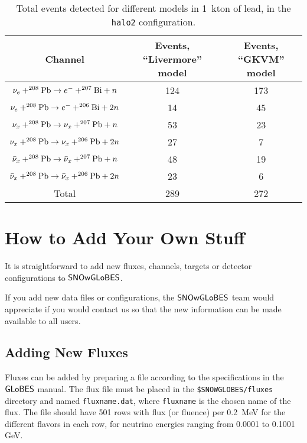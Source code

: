 \documentclass[12pt]{article}
\newcommand{\globes}{\sf{GLoBES}}
\newcommand{\snowglobes}{\sf{SNOwGLoBES}}
\begin{document}
\begin{table}[h]
\centering
\begin{tabular}{|c|c|c|} \hline
Channel & Events, ``Livermore'' model & Events, ``GKVM'' model  \\
\hline

$\nu_e + ^{208}{\rm Pb} \rightarrow e^- + ^{207}{\rm Bi} + n$ & 124  &  173\\
$\nu_e + ^{208}{\rm Pb} \rightarrow e^- + ^{206}{\rm Bi} + 2n$ & 14   & 45 \\
$\nu_x + ^{208}{\rm Pb} \rightarrow \nu_x + ^{207}{\rm Pb} + n$ & 53  & 23 \\
$\nu_x + ^{208}{\rm Pb} \rightarrow \nu_x + ^{206}{\rm Pb} + 2n$ & 27  & 7 \\
$\bar{\nu}_x + ^{208}{\rm Pb} \rightarrow \bar{\nu}_x + ^{207}{\rm Pb} + n$ & 48  & 19 \\
$\bar{\nu}_x + ^{208}{\rm Pb} \rightarrow \bar{\nu}_x + ^{206}{\rm Pb} + 2n$ & 23 & 6 \\



\hline

Total & 289  & 272  \\ \hline
\end{tabular}
\caption{Total events detected for different models in 1~kton of lead, in the \texttt{halo2} configuration. }
\label{tab:leadtable}
\end{table}



\section{How to Add Your Own Stuff}\label{addingnew}

It is straightforward to add new fluxes, channels, targets or detector configurations to $\snowglobes$. 

If you add new data files or configurations, the $\snowglobes$ team would appreciate if you would contact us so that the new information can be made available to all users.

\subsection{Adding New Fluxes}

Fluxes can be added by preparing a file according to the
specifications in the $\globes$ manual.  The flux file must be placed
in the \texttt{\$SNOWGLOBES/fluxes} directory and named
\texttt{fluxname.dat}, where \texttt{fluxname} is the chosen name
of the flux.   The file should have 501 rows with flux (or fluence) per 0.2~MeV for the different flavors in each row, for neutrino energies ranging from 0.0001 to 0.1001 GeV.
\end{document}

